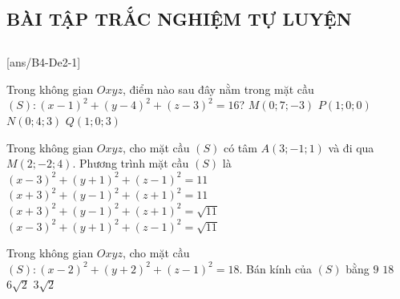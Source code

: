 \subsection{BÀI TẬP TRẮC NGHIỆM TỰ LUYỆN}
\subsection*{} 
	\setcounter{ex}{0}
	[ans/B4-De2-1]

\begin{ex}%
	Trong không gian $Oxyz$, điểm nào sau đây nằm trong mặt cầu $(S)\colon \left(x-1\right)^2+\left(y-4\right)^2+\left(z-3\right)^2=16$?
	\choice
	{$M\left(0;7;-3\right)$}
	{$P\left(1;0;0\right)$}
	{\True $N\left(0;4;3\right)$}
	{$Q\left(1;0;3\right)$}
\end{ex}

\begin{ex}%
	Trong không gian $Oxyz$, cho mặt cầu $(S)$ có tâm $A\left(3;-1;1\right)$ và đi qua $M\left(2;-2;4\right)$. Phương trình mặt cầu $(S)$ là
	\choice
	{\True $\left(x-3\right)^2+\left(y+1\right)^2+\left(z-1\right)^2=11$}
	{$\left(x+3\right)^2+\left(y-1\right)^2+\left(z+1\right)^2=11$}
	{$\left(x+3\right)^2+\left(y-1\right)^2+\left(z+1\right)^2=\sqrt{11}$}
	{$\left(x-3\right)^2+\left(y+1\right)^2+\left(z-1\right)^2=\sqrt{11}$}
\end{ex}

\begin{ex}%
	Trong không gian $Oxyz$, cho mặt cầu $(S):\left(x-2\right)^2+\left(y+2\right)^2+\left(z-1\right)^2=18$. Bán kính của $(S)$ bằng
	\choice
	{$9$}
	{$18$}
	{$6\sqrt{2}$}
	{\True $3\sqrt{2}$}
\end{ex}

